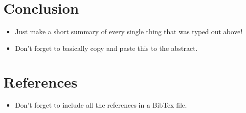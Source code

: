 \documentclass{article}
\begin{document}
\section{Conclusion}
\begin{itemize}
    \item Just make a short summary of every single thing that was typed out above!
    \item Don't forget to basically copy and paste this to the abstract.
\end{itemize}

\section{References}
\begin{itemize}
    \item Don't forget to include all the references in a BibTex file.
\end{itemize}
\end{document}
